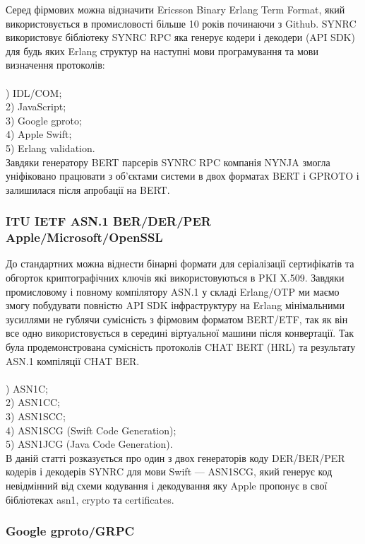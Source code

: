 Серед фірмових можна відзначити Ericsson Binary Erlang Term Format, який використовується в промисловості більше 10 років починаючи з Github. SYNRC використовує бібліотеку SYNRC RPC яка генерує кодери і декодери (API SDK) для будь яких Erlang структур на наступні мови програмування та мови визначення протоколів:\\
\\
) IDL/COM; \\
2) JavaScript; \\
3) Google gproto; \\
4) Apple Swift; \\
5) Erlang validation. \\

Завдяки генератору BERT парсерів SYNRC RPC компанія NYNJA змогла уніфіковано працювати з об'єктами системи в двох форматах BERT і GPROTO і залишилася після апробації на BERT.


\subsubsection{ITU IETF ASN.1 BER/DER/PER Apple/Microsoft/OpenSSL}

До стандартних можна віднести бінарні формати для серіалізації сертифікатів та обгорток криптографічних ключів які використовуються в PKI X.509. Завдяки промисловому і повному компілятору ASN.1 у складі Erlang/OTP ми маємо змогу побудувати повністю API SDK інфраструктуру на Erlang мінімальними зусиллями не гублячи сумісність з фірмовим форматом BERT/ETF, так як він все одно використовується в середині віртуальної машини після конвертації. Так була продемонстрована сумісність протоколів CHAT BERT (HRL) та результату ASN.1 компіляції CHAT BER.\\
\\
) ASN1C; \\
2) ASN1CC; \\
3) ASN1SCC; \\
4) ASN1SCG (Swift Code Generation); \\
5) ASN1JCG (Java Code Generation). \\

В даній статті розказується про один з двох генераторів коду DER/BER/PER кодерів і декодерів SYNRC для мови Swift — ASN1SCG, який генерує код невідмінний від схеми кодування і декодування яку Apple пропонує в свої бібліотеках asn1, crypto та certificates.

\subsubsection{Google gproto/GRPC}

